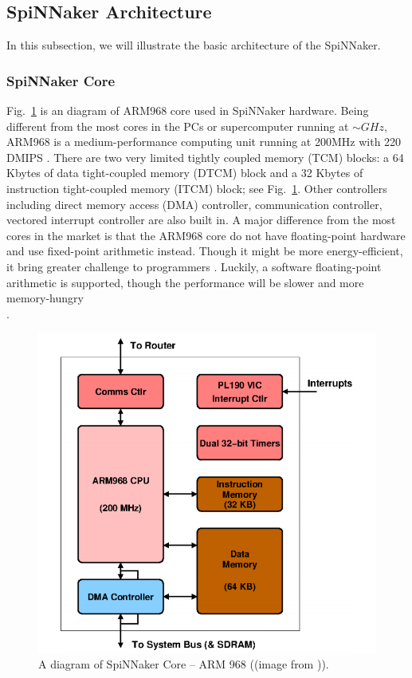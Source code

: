 \subsection{SpiNNaker Architecture} \label{sec:sa}
In this subsection, we will illustrate the basic architecture of the SpiNNaker.
\subsubsection{SpiNNaker Core} \label{sec:ca}

Fig.~\ref{fig:arm_968} is an diagram of ARM968 core used in SpiNNaker hardware. Being different from the most cores in the PCs or supercomputer running at $\sim GHz$, ARM968 is a medium-performance computing unit running at 200MHz with 220 DMIPS \cite{furber2012overview}. There are two very limited tightly coupled memory (TCM) blocks: a 64 Kbytes of data tight-coupled memory (DTCM) block and a 32 Kbytes of instruction tight-coupled memory (ITCM) block; see Fig.~\ref{fig:arm_968}. Other controllers including direct memory access (DMA) controller, communication controller, vectored interrupt controller are also built in. A major difference from the most cores in the market is that the ARM968 core do not have floating-point hardware and use fixed-point arithmetic instead. Though it might be more energy-efficient, it bring greater challenge to programmers \cite{furber2012overview}. Luckily, a software floating-point arithmetic is supported, though the performance will be slower and more memory-hungry\\ \cite{spin-chip-resources}.
    \begin{figure}[!tb]
   \centering
       \includegraphics[width=1\textwidth]{figures/core.png}
       \caption{A diagram of SpiNNaker Core -- ARM 968 ((image from \cite{spin-chip-resources})).}
       \label{fig:arm_968}
    \end{figure}

